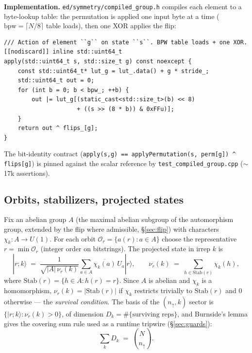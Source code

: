 \documentclass[11pt]{article}
\newcommand{\Stab}{\mathrm{Stab}}
\newcommand{\ket}[1]{|#1\rangle}
\newcommand{\file}[1]{\texttt{\small #1}}
\begin{document}
\textbf{Implementation.} \file{ed/symmetry/compiled\_group.h} compiles each
element to a byte-lookup table: the permutation is applied one input byte at
a time ($\mathrm{bpw} = \lceil N/8 \rceil$ table loads), then one XOR
applies the flip:

\begin{lstlisting}
/// Action of element ``g`` on state ``s``. BPW table loads + one XOR.
[[nodiscard]] inline std::uint64_t
apply(std::uint64_t s, std::size_t g) const noexcept {
    const std::uint64_t* lut_g = lut_.data() + g * stride_;
    std::uint64_t out = 0;
    for (int b = 0; b < bpw_; ++b) {
        out |= lut_g[(static_cast<std::size_t>(b) << 8)
                     + ((s >> (8 * b)) & 0xFFu)];
    }
    return out ^ flips_[g];
}
\end{lstlisting}

The bit-identity contract (\texttt{apply(s,g) ==
applyPermutation(s, perm[g]) \^{} flips[g]}) is pinned against the scalar
reference by \file{test\_compiled\_group.cpp} ($\sim$17k assertions).

\subsection{Orbits, stabilizers, projected states}
\label{sec:repbasis}

Fix an abelian group $A$ (the maximal abelian subgroup of the automorphism
group, extended by the flip where admissible, \S\ref{sec:flip}) with
characters $\chi_k : A \to U(1)$. For each orbit
$\mathcal{O}_r = \{a(r) : a \in A\}$ choose the representative
$r = \min \mathcal{O}_r$ (integer order on bitstrings). The projected state
in irrep $k$ is
\begin{equation}
  \ket{r; k} \;=\; \frac{1}{\sqrt{|A|\, \nu_r(k)}}
    \sum_{a \in A} \overline{\chi_k(a)}\, U_a \ket{r},
  \qquad
  \nu_r(k) \;=\; \sum_{h \in \Stab(r)} \chi_k(h),
  \label{eq:projstate}
\end{equation}
where $\Stab(r) = \{h \in A : h(r) = r\}$. Since $A$ is abelian and
$\chi_k$ is a homomorphism, $\nu_r(k) = |\Stab(r)|$ if $\chi_k$ restricts
trivially to $\Stab(r)$ and $0$ otherwise --- the \emph{survival
condition}. The basis of the $(n_\uparrow, k)$ sector is
$\{\ket{r;k} : \nu_r(k) > 0\}$, of dimension
$D_k = \#\{\text{surviving reps}\}$, and Burnside's lemma gives the
covering sum rule used as a runtime tripwire (\S\ref{sec:guards}):
\begin{equation}
  \sum_k D_k \;=\; \binom{N}{n_\uparrow}.
  \label{eq:burnside}
\end{equation}
\end{document}
